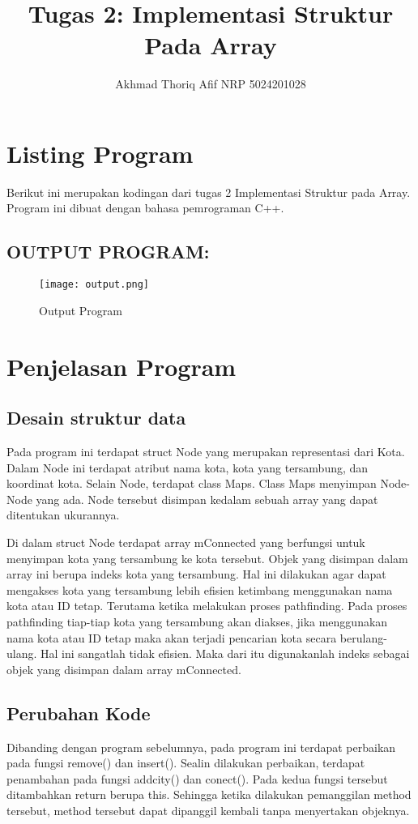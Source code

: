 \documentclass[]{article}
\title{Tugas 2: Implementasi Struktur Pada Array}
\author{Akhmad Thoriq Afif NRP 5024201028}
\begin{document}
\maketitle
\section{Listing Program}
Berikut ini merupakan kodingan dari tugas 2 Implementasi Struktur pada Array. Program ini dibuat dengan bahasa pemrograman C++.

\subsection*{OUTPUT PROGRAM:}
\begin{figure}[htp]
    \centering
    \texttt{[image: output.png]}
    \caption{Output Program}
    \label{fig:galaxy}
\end{figure}
\pagebreak
\section{Penjelasan Program}
\subsection{Desain struktur data}
\par
Pada program ini terdapat struct Node yang merupakan representasi dari Kota. Dalam Node ini terdapat atribut nama kota, kota yang tersambung, dan koordinat kota. Selain Node, terdapat class Maps. Class Maps menyimpan Node-Node yang ada. Node tersebut disimpan kedalam sebuah array yang dapat ditentukan ukurannya.
\par
Di dalam struct Node terdapat array mConnected yang berfungsi untuk menyimpan kota yang tersambung ke kota tersebut. Objek yang disimpan dalam array ini berupa indeks kota yang tersambung. Hal ini dilakukan agar dapat mengakses kota yang tersambung lebih efisien ketimbang menggunakan nama kota atau ID tetap. Terutama ketika melakukan proses pathfinding. Pada proses pathfinding tiap-tiap kota yang tersambung akan diakses, jika menggunakan nama kota atau ID tetap maka akan terjadi pencarian kota secara berulang-ulang. Hal ini sangatlah tidak efisien. Maka dari itu digunakanlah indeks sebagai objek yang disimpan dalam array mConnected.
\subsection{Perubahan Kode}
Dibanding dengan program sebelumnya, pada program ini terdapat perbaikan pada fungsi remove() dan insert(). Sealin dilakukan perbaikan, terdapat penambahan pada fungsi addcity() dan conect(). Pada kedua fungsi tersebut ditambahkan return berupa this. Sehingga ketika dilakukan pemanggilan method tersebut, method tersebut dapat dipanggil kembali tanpa menyertakan objeknya.
\end{document}
